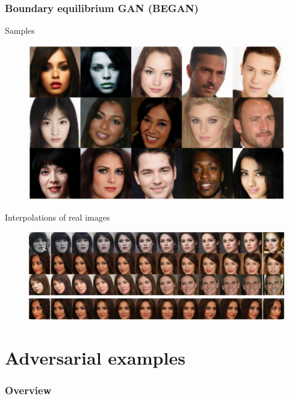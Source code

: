 \documentclass{beamer}
\begin{document}
\begin{frame}
\frametitle{Boundary equilibrium GAN (BEGAN)}
Samples
\begin{figure}
  \includegraphics[height=.3\textheight]{BEGAN_samples1.jpg} \\
\end{figure}
Interpolations of real images
\begin{figure}
  \includegraphics[height=.3\textheight]{BEGAN_samples2.png} \\
  \includegraphics[height=.1\textheight]{BEGAN_samples3.png}
\end{figure}
\end{frame}

\section{Adversarial examples}

\begin{frame}
\frametitle{Overview}
\tableofcontents[currentsection]
\end{frame}
\end{document}
